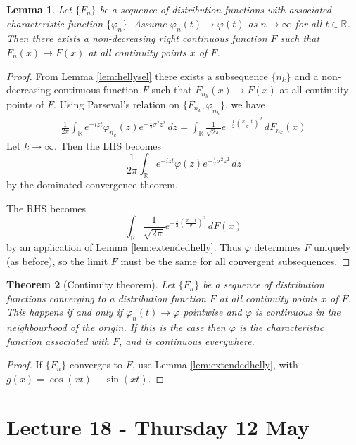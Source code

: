 \documentclass[10pt, oneside, reqno]{amsart}
\theoremstyle{plain}%
\newtheorem{thm}{Theorem}[section]
\newtheorem{lem}[thm]{Lemma}
\theoremstyle{definition}
\theoremstyle{remark}
\renewcommand{\phi}{\varphi}
\newcommand{\R}{\mathbb{R}}
\begin{document}
\begin{lem}
	Let $\{ F_n \}$ be a sequence of distribution functions with associated characteristic function $\{ \phi_n \}$.  Assume $\phi_n(t) \rightarrow \phi(t)$ as $n \rightarrow \infty$ for all $t \in \R$.  Then there exists a non-decreasing right continuous function $F$ such that $F_n(x) \rightarrow F(x)$ at all continuity points $x$ of $F$. 
\end{lem}
\begin{proof}
	From Lemma \ref{lem:hellysel} there exists a subsequence $\{ n_k \}$ and a non-decreasing continuous function $F$ such that $F_{n_k} (x) \rightarrow F(x)$ at all continuity points of $F$.  Using Parseval's relation on $\{ F_{n_k}, \phi_{n_k} \}$, we have \begin{align*}
		\frac{1}{2 \pi} \int_\R e^{-izt} \phi_{n_k}(z) e^{- \frac{1}{2} \sigma^2 z^2} \, dz = \int_\R \frac{1}{\sqrt{2 \pi}} e^{- \frac{1}{2} \left( \frac{x-t}{\sigma} \right)^2} \, dF_{n_k}(x)
	\end{align*}  Let $k \rightarrow \infty$.  Then the LHS becomes \[
		\frac{1}{2 \pi} \int_\R e^{-i z t} \phi(z) e^{- \frac{1}{2} \sigma^2 z^2} \, dz 
	\] by the dominated convergence theorem. 
	
	The RHS becomes \[
		\int_\R \frac{1}{\sqrt{2 \pi}} e^{- \frac{1}{2} \left( \frac{x-t}{\sigma} \right)^2} \, dF(x)
	\] by an application of Lemma \ref{lem:extendedhelly}.  Thus $\phi$ determines $F$ uniquely (as before), so the limit $F$ must be the same for all convergent subsequences.  
\end{proof}

\begin{thm}[Continuity theorem]
	Let $\{ F_n \}$ be a sequence of distribution functions converging to a distribution function $F$ at all continuity points $x$ of $F$.  This happens if and only if $\phi_n(t) \rightarrow \phi$ pointwise and $\phi$ is continuous in the neighbourhood of the origin.  If this is the case then $\phi$ is the characteristic function associated with $F$, and is continuous everywhere.
\end{thm}  

\begin{proof}
	If $\{ F_n \}$ converges to $F$, use Lemma \ref{lem:extendedhelly}, with $g(x) = \cos(xt) + \sin(xt)$.
\end{proof}

\section{Lecture 18 - Thursday 12 May} %
\label{sec:lecture_18_thursday_12_may}
\end{document}
